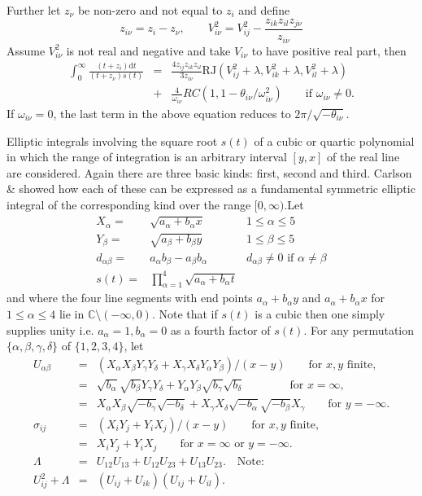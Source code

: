 Further let $z_\nu$ be non-zero and not equal to $z_i$ and define
\[z_{i\nu}=z_i-z_\nu,\qquad V_{i\nu}^2 = V_{ij}^2-\frac{z_{ik}z_{il}z_{j\nu}}{z_{i\nu}} \]
Assume $V_{i\nu}^2$ is not real and negative  and take $V_{i\nu}$ to have positive
real part, then
\begin{eqnarray*}
\int_0^\infty \frac{(t+z_i)\mathrm{d}t}{(t+z_\nu)s(t)} &=&
\frac{4z_{ij}z_{ik}z_{il}}{3z_{i\nu}}\mathrm{RJ}(V_{ij}^2+\lambda, V_{ik}^2+\lambda, V_{il}^2+\lambda) \\
&+&\frac{4}{\omega_{i\nu}}RC(1, 1-\theta_{i\nu}/\omega_{i\nu}^2) \qquad
\mbox{if }\omega_{i\nu} \neq 0.
\end{eqnarray*}
If $\omega_{i\nu}=0$, the last term in the above equation reduces to
$2\pi/\sqrt{-\theta_{i\nu}}$.


Elliptic integrals involving the square root $s(t)$ of a cubic or quartic
polynomial in which the range of integration is an arbitrary interval $[y,x]$
of the real line are considered. Again there are three basic kinds: first,
second and third. Carlson \cite{Carlson:88} \& \cite{Carlson:99} showed how each
of these can be expressed as a fundamental symmetric elliptic integral of the
corresponding kind over the range $[0,\infty)$.Let
\begin{eqnarray*}
X_\alpha  = & \sqrt{a_\alpha+b_\alpha x} \quad & 1 \leq \alpha \leq 5\\
Y_\beta  = & \sqrt{a_\beta+b_\beta y} \quad & 1 \leq \beta \leq 5\\
d_{\alpha\beta}  = & a_\alpha b_\beta - a_\beta b_\alpha \quad & d_{\alpha\beta} \neq 0\mbox{ if } \alpha \neq \beta\\
s(t)  = &  \prod^4_{\alpha=1} \sqrt{a_\alpha+b_\alpha t}
\end{eqnarray*}
and where the four line segments with end points $a_\alpha+b_\alpha y$ and
$a_\alpha+b_\alpha x$ for $1\leq\alpha\leq 4$ lie in $ \mathbb{C} \setminus (-\infty, 0)$.
Note that if $s(t)$ is a cubic then one simply supplies unity
i.e. $a_\alpha=1, b_\alpha=0$ as a fourth factor of $s(t)$.
For any permutation $\{\alpha,\beta,\gamma,\delta\}$ of $\{1,2,3,4\}$, let
\begin{eqnarray*}
U_{\alpha\beta} &=& (X_\alpha X_\beta Y_\gamma Y_\delta + X_\gamma X_\delta Y_\alpha Y_\beta)
  /(x-y) \qquad \mbox{for } x,y \mbox{ finite},\\
  & = & \sqrt{b_\alpha}\sqrt{b_\beta}Y_\gamma Y_\delta + Y_\alpha Y_\beta
  \sqrt{b_\gamma}\sqrt{b_\delta} \qquad \qquad \mbox{for } x = \infty,\\
  & = & X_\alpha X_\beta \sqrt{-b_\gamma}\sqrt{-b_\delta}+X_\gamma X_\delta
  \sqrt{-b_\alpha}\sqrt{-b_\beta}X_\gamma \qquad \mbox{for } y = -\infty.\\
  \sigma_{ij} &=& (X_iY_j+Y_iX_j)/(x-y)\qquad \mbox{for } x,y \mbox{ finite},\\
  & = & X_iY_j+Y_iX_j \qquad \mbox{for }x =\infty \mbox{ or } y=-\infty.\\
  \Lambda &=& U_{12}U_{13}+U_{12}U_{23}+U_{13}U_{23}.\quad \mbox{Note:} \\
  U_{ij}^2 +\Lambda &=& (U_{ij}+U_{ik})(U_{ij}+U_{il}).
\end{eqnarray*}

